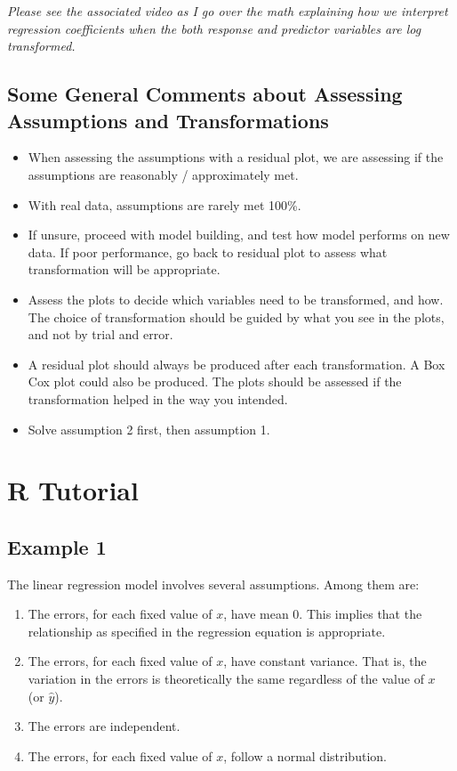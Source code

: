 \documentclass[
]{book}
\providecommand{\tightlist}{%
  \setlength{\itemsep}{0pt}\setlength{\parskip}{0pt}}
\begin{document}
\emph{Please see the associated video as I go over the math explaining how we interpret regression coefficients when the both response and predictor variables are log transformed.}

\hypertarget{some-general-comments-about-assessing-assumptions-and-transformations}{%
\subsection{Some General Comments about Assessing Assumptions and Transformations}\label{some-general-comments-about-assessing-assumptions-and-transformations}}

\begin{itemize}
\item
  When assessing the assumptions with a residual plot, we are assessing if the assumptions are reasonably / approximately met.
\item
  With real data, assumptions are rarely met 100\%.
\item
  If unsure, proceed with model building, and test how model performs on new data. If poor performance, go back to residual plot to assess what transformation will be appropriate.
\item
  Assess the plots to decide which variables need to be transformed, and how. The choice of transformation should be guided by what you see in the plots, and not by trial and error.
\item
  A residual plot should always be produced after each transformation. A Box Cox plot could also be produced. The plots should be assessed if the transformation helped in the way you intended.
\item
  Solve assumption 2 first, then assumption 1.
\end{itemize}

\hypertarget{r-tutorial-2}{%
\section{R Tutorial}\label{r-tutorial-2}}

\hypertarget{example-1}{%
\subsection{Example 1}\label{example-1}}

The linear regression model involves several assumptions. Among them are:

\begin{enumerate}
\def\labelenumi{\arabic{enumi}.}
\tightlist
\item
  The errors, for each fixed value of \(x\), have mean 0. This implies that the relationship as specified in the regression equation is appropriate.
\item
  The errors, for each fixed value of \(x\), have constant variance. That is, the variation in the errors is theoretically the same regardless of the value of \(x\) (or \(\hat{y}\)).
\item
  The errors are independent.
\item
  The errors, for each fixed value of \(x\), follow a normal distribution.
\end{enumerate}
\end{document}
